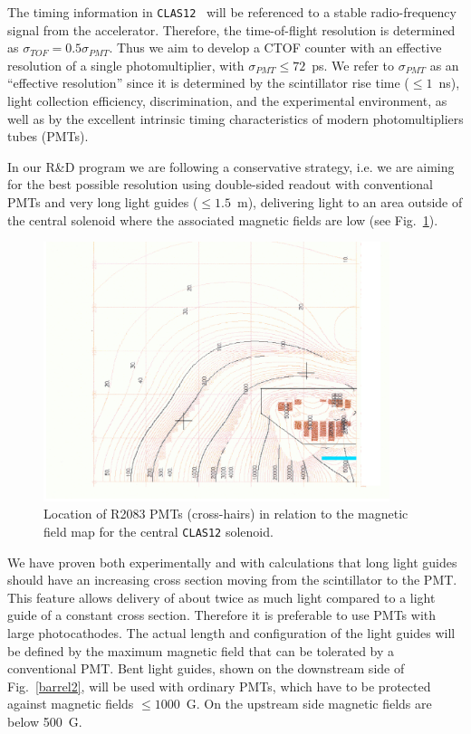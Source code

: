 The timing information in {\tt CLAS12}~\cite{r2} will be referenced to 
a stable radio-frequency signal from the accelerator.  Therefore, the 
time-of-flight resolution is determined as $\sigma_{TOF} = 0.5 \sigma_{PMT}$.
Thus we aim to develop a CTOF counter with an effective resolution of a
single photomultiplier, with $\sigma_{PMT} \leq 72$~ps.  We refer to 
$\sigma_{PMT}$ as an ``effective resolution'' since it is determined by 
the scintillator rise time ($\leq 1$~ns), light collection efficiency, 
discrimination, and the experimental environment, as well as by the 
excellent intrinsic timing characteristics of modern photomultipliers 
tubes (PMTs).

In our R\&D program we are following a conservative strategy, i.e. we 
are aiming for the best possible resolution using double-sided readout 
with conventional PMTs and very long light guides ($\leq 1.5$~m), delivering 
light to an area outside of the central solenoid where the associated 
magnetic fields are low (see Fig.~\ref{fig:mmap1}).

\begin{figure}[htbp]
\centering
\includegraphics[width=0.9\textwidth]{mmap1.eps}
\caption{\small{Location of R2083 PMTs (cross-hairs) in relation to the 
magnetic field map for the central {\tt CLAS12} solenoid.}}
\label{fig:mmap1}
\end{figure}

We have proven both experimentally and with calculations that long light 
guides should have an increasing cross section moving from the scintillator
to the PMT.  This feature allows delivery of about twice as much light 
compared to a light guide of a constant cross section.  Therefore it is 
preferable to use PMTs with large photocathodes.  The actual length and 
configuration of the light guides will be defined by the maximum magnetic 
field that can be tolerated by a conventional PMT.  Bent light guides, shown 
on the downstream side of Fig.~\ref{barrel2}, will be used with ordinary PMTs, 
which have to be protected against magnetic fields $\leq 1000$~G.  On the 
upstream side magnetic fields are below 500~G.

